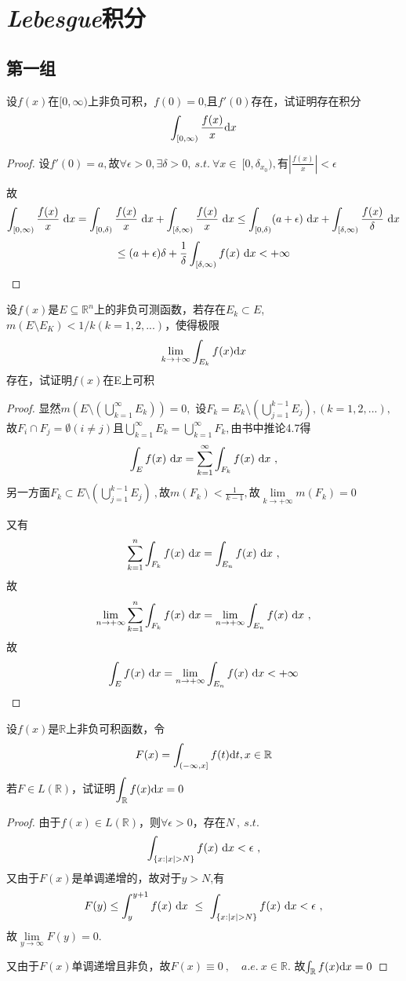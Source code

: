 \chapter{\emph{Lebesgue}积分}

\section{第一组}

设$f(x)$在$[0,\infty)$上非负可积，$f(0)=0$,且$f'(0)$存在，试证明存在积分$$\int_{[0,\infty)} \frac{f(x)}{x} \mathrm{d}x$$
\begin{proof}
设$f'(0)=a,$故$\forall \epsilon>0,\exists\delta>0,\ s.t. \ \forall x\in\ [0,\delta_{x_0}),$有$\left|\frac{f(x)}{x}\right|<\epsilon$\par 
故
$$\int_{[0,\infty)}\frac{f(x)}{x}\ \di{x}=
\int_{[0,\delta)}\frac{f(x)}{x}\ \di{x}+
\int_{[\delta,\infty)}\frac{f(x)}{x}\ \di{x}
\leq \int_{[0,\delta)}(a+\epsilon) \ \di{x}+
\int_{[\delta,\infty)}\frac{f(x)}{\delta}\ \di{x}$$
$$\leq (a+\epsilon)\delta +\frac{1}{\delta}\int_{[\delta,\infty)}f(x)\ \mathrm{d}x
<+\infty$$
\end{proof}



设$f(x)$是$E \subseteq \mathbb{R}^{n}$上的非负可测函数，若存在$E_k \subset E$,$m(E \setminus {E_K})<1/k(k=1,2,...)$，使得极限$$\lim\limits_{k \to +\infty} \int_{E_k} f(x) \mathrm{d}x $$存在，试证明$f(x)$在E上可积
\begin{proof}
显然$m\left(E\setminus (\bigcup\limits_{k=1}^{\infty}E_k) \right)=0,$
设$F_k=E_k\setminus (\bigcup\limits_{j=1}^{k-1}E_j),(k=1,2,...),$故$F_i\cap F_j=\emptyset(i\neq j)$且$\bigcup\limits_{k=1}^{\infty}E_k=\bigcup\limits_{k=1}^{\infty}F_k,$由书中推论4.7得$$\int_{E}f(x)\ \di{x}=\sum_{k=1}^{\infty}\int_{F_k}f(x)\ \di{x}\ ,$$另一方面$F_k\subset E\setminus\left(\bigcup\limits_{j=1}^{k-1}E_j\right)\ ,$故$m(F_k)<\frac{1}{k-1},$故$\lim\limits_{k \to +\infty}m(F_k)=0$\par 
又有$$\sum_{k=1}^{n}\int_{F_k}f(x)\ \di{x}=\int_{E_n}f(x)\ \di{x}\ ,$$故$$\lim\limits_{n \to +\infty}\sum_{k=1}^{n}\int_{F_k}f(x)\ \mathrm{d}x=\lim\limits_{n \to +\infty}\int_{E_n}f(x)\ \mathrm{d}x\ ,$$故$$\int_{E}f(x)\ \mathrm{d}x=\lim\limits_{n \to +\infty}\int_{E_n}f(x)\ \mathrm{d}x<+\infty$$
\end{proof}


设$f(x)$是$\mathbb{R}$上非负可积函数，令$$F(x)=\int_{(-\infty,x]}f(t) \mathrm{d}t,  x\in \mathbb{R}$$
若$F \in L(\mathbb{R}) $，试证明$\displaystyle{\int_{\mathbb{R}}f(x) \mathrm{d}x=0}$
\begin{proof}
由于$f(x)\in L(\mathbb{R})$，则$\forall \epsilon>0$，存在$N\ ,\ s.t.\ $$$\int_{\{x:|x|>N\}}f(x)\ \di{x}<\epsilon\ ,$$又由于$F(x)$是单调递增的，故对于$y>N$,有$$F(y)\leq \int_{y}^{y+1}f(x)\ \di{x} \ \leq\ \int_{\{x:|x|>N\}}f(x)\ \di{x}<\epsilon\ ,$$故$\lim\limits_{y \to \infty}F(y)=0.$\par
又由于$F(x)$单调递增且非负，故$F(x)\equiv 0\ ,\quad a.e. \ x \in \mathbb{R}.$ 故$\int_{\mathbb{R}}f(x) \mathrm{d}x=0$
\end{proof}



